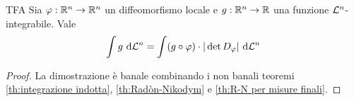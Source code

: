 \documentclass{article}
\begin{document}
\begin{theorem}{TFA}{}
    Sia $\varphi : \mathbb{R}^n \to \mathbb{R}^n$ un diffeomorfismo locale e $g : \mathbb{R}^n \to \mathbb{R}$ una funzione $\mathcal{L}^n$-integrabile. Vale
    \[\intop g \de \L^n = \int (g \circ \varphi)\cdot |\det D_\varphi|\de \L^n\]
    \begin{proof}
        La dimostrazione è banale combinando i non banali teoremi \ref{th:integrazione indotta}, \ref{th:Radòn-Nikodym} e \ref{th:R-N per misure finali}.
    \end{proof}
\end{theorem}

\printbibliography
\end{document}
